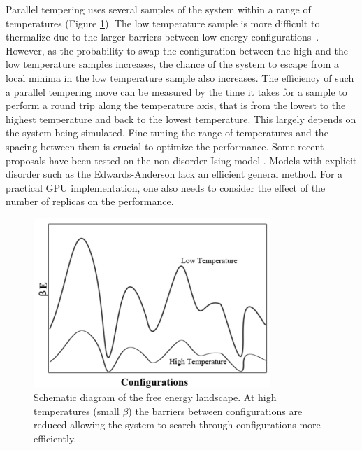Parallel tempering uses several samples of the system within a range of 
temperatures (Figure \ref{fig-pt}). The low temperature sample is more difficult 
to thermalize due to the larger barriers between low energy 
configurations~\cite{Marinari-Parisi1992,Hukushima-Nemoto1996}.
However, as the probability to swap the configuration between the high and the low temperature samples 
increases, the chance of the system to escape from a local minima in the low temperature sample also 
increases. The efficiency of such a parallel 
tempering move can be measured by the time it takes for a sample to perform a 
round trip along the temperature axis, that is from the lowest to the highest 
temperature and back to the lowest temperature. This largely depends on 
the system being simulated. Fine tuning the range of temperatures and the 
spacing between them is crucial to optimize the performance. Some 
recent proposals have been tested on the non-disorder Ising model 
\cite{PhysRevLett.101.130603,1742-5468-2006-03-P03018,jcp/124/17/10.1063/1.2186639}.
Models with explicit disorder such as the Edwards-Anderson lack an efficient 
general method. For a practical GPU implementation, one also 
needs to consider the effect of the number of replicas on the performance.


\begin{figure}[ht]
  \centering
  \includegraphics[width=0.8\textwidth] {img/barrier.pdf}
  \caption{Schematic diagram of the free energy landscape.  At high temperatures 
(small $\beta$) the barriers between configurations are reduced allowing the 
system to search through configurations more efficiently.}
\label{fig-pt}
\end{figure}







